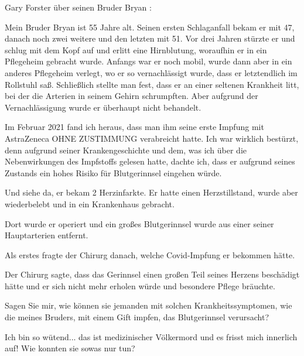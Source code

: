 Gary Forster über seinen Bruder Bryan :

Mein Bruder Bryan ist 55 Jahre alt. Seinen ersten Schlaganfall bekam er mit 47,
danach noch zwei weitere und den letzten mit 51. Vor drei Jahren stürzte er und
schlug mit dem Kopf auf und erlitt eine Hirnblutung, woraufhin er in ein
Pflegeheim gebracht wurde. Anfangs war er noch mobil, wurde dann aber in ein
anderes Pflegeheim verlegt, wo er so vernachlässigt wurde, dass er letztendlich
im Rollstuhl saß. Schließlich stellte man fest, dass er an einer seltenen
Krankheit litt, bei der die Arterien in seinem Gehirn schrumpften. Aber aufgrund
der Vernachlässigung wurde er überhaupt nicht behandelt.

Im Februar 2021 fand ich heraus, dass man ihm seine erste Impfung mit
AstraZeneca OHNE ZUSTIMMUNG verabreicht hatte. Ich war wirklich bestürzt, denn
aufgrund seiner Krankengeschichte und dem, was ich über die Nebenwirkungen des
Impfstoffs gelesen hatte, dachte ich, dass er aufgrund seines Zustands ein hohes
Risiko für Blutgerinnsel eingehen würde.

Und siehe da, er bekam 2 Herzinfarkte. Er hatte einen Herzstillstand, wurde aber
wiederbelebt und in ein Krankenhaus gebracht.

Dort wurde er operiert und ein großes Blutgerinnsel wurde aus einer seiner
Hauptarterien entfernt.

Als erstes fragte der Chirurg danach, welche Covid-Impfung er bekommen hätte.

Der Chirurg sagte, dass das Gerinnsel einen großen Teil seines Herzens
beschädigt hätte und er sich nicht mehr erholen würde und besondere Pflege
bräuchte.

Sagen Sie mir, wie können sie jemanden mit solchen Krankheitssymptomen, wie die
meines Bruders, mit einem Gift impfen, das Blutgerinnsel verursacht?

Ich bin so wütend... das ist medizinischer Völkermord und es frisst mich
innerlich auf! Wie konnten sie sowas nur tun?
